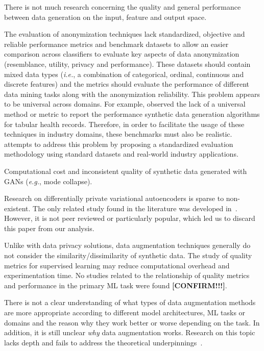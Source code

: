 \documentclass[parskip=full]{scrartcl}
\begin{document}

There is not much research concerning the quality and general performance
between data generation on the input, feature and output space.

The evaluation of anonymization techniques lack standardized, objective and
reliable performance metrics and benchmark datasets to allow an easier
comparison across classifiers to evaluate key aspects of data anonymization
(resemblance, utility, privacy and performance). These datasets should contain
mixed data types (\textit{i.e.}, a combination of categorical, ordinal,
continuous and discrete features) and the metrics should evaluate the
performance of different data mining tasks along with the anonymization
reliability. This problem appears to be universal across domains. For example,
\citet{hernandez2022synthetic} observed the lack of a universal method or
metric to report the performance synthetic data generation algorithms for
tabular health records. Therefore, in order to facilitate the usage of these
techniques in industry domains, these benchmarks must also be
realistic. \citet{rosenblatt2020differentially} attempts to address this
problem by proposing a standardized evaluation methodology using standard
datasets and real-world industry applications.

Computational cost and inconsistent quality of synthetic data generated with
GANs (\textit{e.g.}, mode collapse).

Research on differentially private variational autoencoders is sparse to
non-existent. The only related study found in the literature was developed
in~\cite{takahashi2020differentially}. However, it is not peer reviewed or
particularly popular, which led us to discard this paper from our analysis.

Unlike with data privacy solutions, data augmentation techniques generally do
not consider the similarity/dissimilarity of synthetic data. The study of
quality metrics for supervised learning may reduce computational overhead and
experimentation time. No studies related to the relationship of quality
metrics and performance in the primary ML task were found
\textbf{[CONFIRM!!!]}.

There is not a clear understanding of what types of data augmentation methods
are more appropriate according to different model architectures, ML tasks or
domains and the reason why they work better or worse depending on the task. 
In addition, it is still unclear \textit{why} data augmentation works.
Research on this topic lacks depth and fails to address the theoretical
underpinnings~\cite{feng2021survey}.
\end{document}

